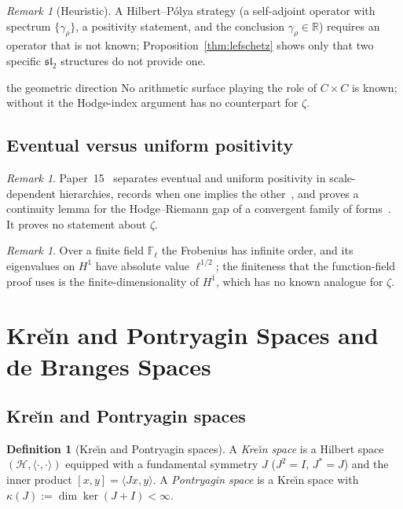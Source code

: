 \documentclass[11pt]{amsart}
\theoremstyle{definition}
\newtheorem{definition}[theorem]{Definition}
\theoremstyle{remark}
\newtheorem{remark}[theorem]{Remark}
\newcommand{\kap}{\kappa}
\newcommand{\gam}{\gamma}
\begin{document}
\begin{remark}[Heuristic]
A Hilbert--P\'olya strategy (a self-adjoint operator with spectrum $\{\gam_\rho\}$, a
positivity statement, and the conclusion $\gam_\rho\in\mathbb R$) requires an operator
that is not known; Proposition~\ref{thm:lefschetz} shows only that two specific
$\mathfrak{sl}_2$ structures do not provide one.
\end{remark}

\begin{wallbox}{the geometric direction}
No arithmetic surface playing the role of $C\times C$ is known; without it the Hodge-index
argument has no counterpart for $\zeta$.
\end{wallbox}

\subsection{Eventual versus uniform positivity}

\begin{remark}
\label{thm:finitization}
Paper~15~\cite{P15} separates eventual and uniform positivity in scale-dependent
hierarchies, records when one implies the other~\cite[Thm.~3.1]{P15}, and proves a
continuity lemma for the Hodge--Riemann gap of a convergent family of forms~\cite[Lemma~8.2]{P15}.
It proves no statement about $\zeta$.
\end{remark}

\begin{remark}
Over a finite field $\mathbb F_\ell$ the Frobenius has infinite order, and its eigenvalues on
$H^1$ have absolute value $\ell^{1/2}$; the finiteness that the function-field proof uses
is the finite-dimensionality of $H^1$, which has no known analogue for $\zeta$.
\end{remark}

\section{Kre\u\i n and Pontryagin Spaces and de Branges Spaces}
\label{sec:functional}

\subsection{Kre\u\i n and Pontryagin spaces}

\begin{definition}[Kre\u\i n and Pontryagin spaces]
A \emph{Kre\u\i n space} is a Hilbert space $(\mathcal{H}, \langle\cdot,\cdot\rangle)$
equipped with a fundamental symmetry $J$ ($J^2=I$, $J^*=J$) and the inner product
$[x,y] = \langle Jx,y\rangle$.  A \emph{Pontryagin space} is a Kre\u\i n space with
$\kap(J):=\dim\ker(J+I)<\infty$.
\end{definition}
\end{document}
